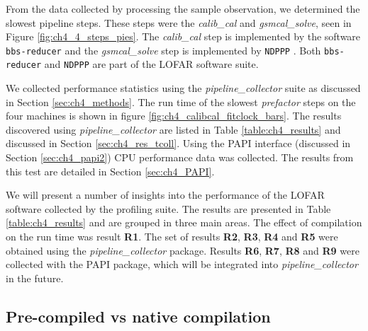 From the data collected by processing the sample observation, we determined the slowest pipeline steps. These steps were the \textit{calib\_cal} and \textit{gsmcal\_solve}, seen in Figure \ref{fig:ch4_4_steps_pies}. The \textit{calib\_cal} step is implemented by the software \texttt{bbs-reducer} \citep{cookbook,bbs_selfcal} and the \textit{gsmcal\_solve} step is implemented by \texttt{NDPPP} \citep{cookbook,lofar_NDPPP}. Both \texttt{bbs-reducer} and \texttt{NDPPP} are part of the LOFAR software suite.

We collected performance statistics using the \textit{pipeline\_collector} suite as discussed in Section \ref{sec:ch4_methods}. The run time of the slowest \textit{prefactor} steps on the four machines is shown in figure \ref{fig:ch4_calibcal_fitclock_bars}. The results discovered using \textit{pipeline\_collector} are listed in Table \ref{table:ch4_results} and discussed in Section \ref{sec:ch4_res_tcoll}. Using the PAPI interface (discussed in Section \ref{sec:ch4_papi2}) CPU performance data was collected. The results from this test are detailed in Section \ref{sec:ch4_PAPI}.


 
We will present a number of insights into the performance of the LOFAR software collected by the profiling suite. The results are presented in Table \ref{table:ch4_results} and are grouped in three main areas. The effect of compilation on the run time was result \textbf{R1}. The set of results \textbf{R2}, \textbf{R3}, \textbf{R4} and \textbf{R5} were obtained using the \textit{pipeline\_collector} package. Results  \textbf{R6}, \textbf{R7}, \textbf{R8} and \textbf{R9} were collected with the PAPI package, which will be integrated into \textit{pipeline\_collector} in the future.  

\subsection{Pre-compiled vs native compilation}

